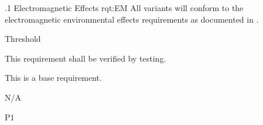 

\ONERQMTVKSA
{\RqtNumberBase.1}
{Electromagnetic Effects}
{rqt:EM}
{All \ThisSystem variants will conform to the electromagnetic environmental effects requirements as documented in \TBD.}
{
	\item [Phase 1] Threshold
}
{This requirement shall be verified by testing.}
{
\item [N/A] This is a base requirement.
}
{
	\item N/A
}
{P1}
